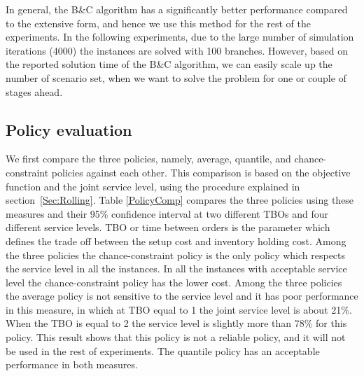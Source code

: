 \documentclass[11pt]{article}
\begin{document}
In general, the B\&C algorithm has a significantly better performance compared to the extensive form, and hence we use this method for the rest of the experiments. 
In the following experiments, due to the large number of simulation iterations (4000) the instances are solved with 100 branches. However, based on the reported solution time of the B\&C algorithm, we can easily scale up the number of scenario set, when we want to solve the problem for one or couple of stages ahead.

\subsection{Policy evaluation}

We first compare the three policies, namely, average, quantile, and chance-constraint policies against each other.
This comparison is based on the objective function and the joint service level, using the procedure explained in section~\ref{Sec:Rolling}. Table \ref{PolicyComp} compares the three policies using these measures and their 95\% confidence interval at two different TBOs and four different service levels. TBO or time between orders is the parameter which defines the trade off between the setup cost and inventory holding cost. Among the three policies the chance-constraint policy is the only policy which respects the service level in all the instances. In all the instances with acceptable service level the chance-constraint policy has the lower cost. Among the three policies the average policy is not sensitive to the service level and it has poor performance in this measure, in which at TBO equal to 1 the joint service level is about 21\%. When the TBO is equal to 2 the service level is slightly more than 78\% for this policy. This result shows that this policy is not a reliable policy, and it will not be used in the rest of experiments. The quantile policy has an acceptable performance in both measures. 
\end{document}

